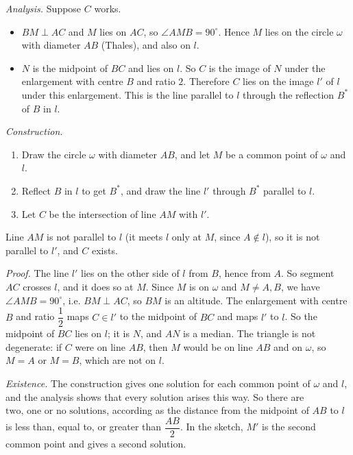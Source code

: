 \emph{Analysis.} Suppose $C$ works.
\begin{itemize}
\item $BM\perp AC$ and $M$ lies on $AC$, so $\angle AMB=90^\circ$. Hence $M$ lies on the circle $\omega$ with diameter $AB$ (Thales), and also on $l$.
\item $N$ is the midpoint of $BC$ and lies on $l$. So $C$ is the image of $N$ under the enlargement with centre $B$ and ratio $2$. Therefore $C$ lies on the image $l'$ of $l$ under this enlargement. This is the line parallel to $l$ through the reflection $B^*$ of $B$ in $l$.
\end{itemize}

\emph{Construction.}
\begin{enumerate}
\item Draw the circle $\omega$ with diameter $AB$, and let $M$ be a common point of $\omega$ and $l$.
\item Reflect $B$ in $l$ to get $B^*$, and draw the line $l'$ through $B^*$ parallel to $l$.
\item Let $C$ be the intersection of line $AM$ with $l'$.
\end{enumerate}
Line $AM$ is not parallel to $l$ (it meets $l$ only at $M$, since $A\notin l$), so it is not parallel to $l'$, and $C$ exists.

\emph{Proof.} The line $l'$ lies on the other side of $l$ from $B$, hence from $A$. So segment $AC$ crosses $l$, and it does so at $M$. Since $M$ is on $\omega$ and $M\ne A,B$, we have $\angle AMB=90^\circ$, i.e. $BM\perp AC$, so $BM$ is an altitude. The enlargement with centre $B$ and ratio $\dfrac12$ maps $C\in l'$ to the midpoint of $BC$ and maps $l'$ to $l$. So the midpoint of $BC$ lies on $l$; it is $N$, and $AN$ is a median. The triangle is not degenerate: if $C$ were on line $AB$, then $M$ would be on line $AB$ and on $\omega$, so $M=A$ or $M=B$, which are not on $l$.

\emph{Existence.} The construction gives one solution for each common point of $\omega$ and $l$, and the analysis shows that every solution arises this way. So there are $\boxed{\text{two, one or no solutions}}$, according as the distance from the midpoint of $AB$ to $l$ is less than, equal to, or greater than $\dfrac{AB}2$. In the sketch, $M'$ is the second common point and gives a second solution.

